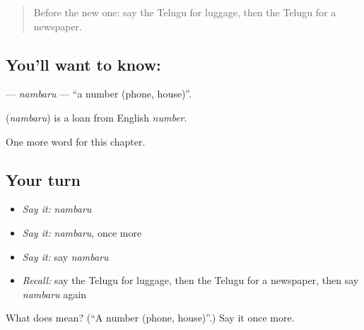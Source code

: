 \label{lesson:TE-C264-nambaru}



\begin{quote}
Before the new one: say the Telugu for luggage, then the Telugu for a newspaper.
\end{quote}

\subsection*{You'll want to know: }
\textbf{} — \emph{nambaru} — \textquotedblleft{}a number (phone, house)\textquotedblright{}.

\begin{cousinweb}
\textbf{} (\emph{nambaru}) is a loan from English \emph{number}.
\end{cousinweb}

\begin{grammarlens}[title={What you've built}]
One more word for this chapter.
\end{grammarlens}

\subsection*{Your turn}
\begin{itemize}
\raggedright
  \item \emph{Say it:} \emph{nambaru}
  \item \emph{Say it:} \emph{nambaru}, once more
  \item \emph{Say it:} say \emph{nambaru}
  \item \emph{Recall:} say the Telugu for luggage, then the Telugu for a newspaper, then say \emph{nambaru} again
\end{itemize}

\begin{tcolorbox}[breakable,colback=teal!4,colframe=teal!35!black,title={Before you move on}]
What does  mean? (\textquotedblleft{}A number (phone, house)\textquotedblright{}.) Say it once more.
\end{tcolorbox}
